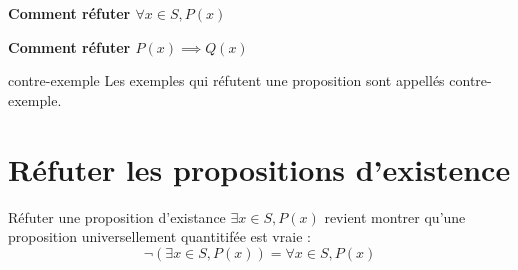 \documentclass[16pt]{report}
\begin{document}
\begin{multicols*}{2}
            \begin{center}
            \textbf{Comment réfuter $\forall x \in S, P(x)$}  
            \\
            \noindent{}
            \end{center}


            \begin{center}
            \textbf{Comment réfuter $P(x) \implies  Q(x)$}  
            \\
            \noindent{}
            \end{center}


            \begin{Definitionx}{contre-exemple}{}
                Les exemples qui réfutent une proposition sont appellés contre-exemple.
            \end{Definitionx}
            

            
            \section{\textcolor{myp}{\textbf{Réfuter les propositions d'existence}}}

            Réfuter une proposition d'existance $\exists x \in S, P(x)$ revient montrer qu'une 
            proposition universellement quantitifée est vraie :
            \[ \neg (\exists x \in S, P(x))  = \forall x \in S, P(x) \]




\end{multicols*}
\end{document}
